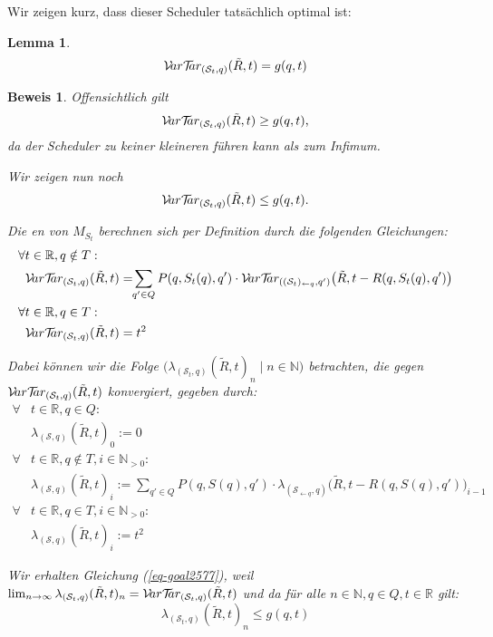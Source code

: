 \documentclass[a4paper]{article}
\newtheorem{lemma}[satz]{Lemma}
\theoremstyle{nonumberplain}
\newtheorem{beweis}{Beweis}
\begin{document}
	Wir zeigen kurz, dass dieser Scheduler tatsächlich optimal ist:
	\begin{lemma}
		\begin{equation}
		\mathcal{V}\!ar \mathcal{T}\!\!ar_{(\mathcal{S}_t,q)}(\tilde{R},t) = g(q,t)
		\end{equation}
	\end{lemma}
	\begin{beweis}
		Offensichtlich gilt 
		\[\mathcal{V}\!ar \mathcal{T}\!\!ar_{(\mathcal{S}_t,q)}(\tilde{R},t) \geq g(q,t)\text{,}\]
		da der Scheduler zu keiner kleineren \vt{} führen kann als zum Infimum.
		
		Wir zeigen nun noch
		\begin{equation}\label{eq-goal2577}
		\mathcal{V}\!ar \mathcal{T}\!\!ar_{(\mathcal{S}_t,q)}(\tilde{R},t) \leq g(q,t)\text{.}
		\end{equation}
		
		Die \vt{}en von $M_{S_t}$ berechnen sich per Definition durch die folgenden Gleichungen:
		\begin{align*}
		\forall & t \in \mathbb{R}, q \notin T : \\
		& \mvt_{(\mathcal{S}_t,q)}(\tilde{R},t) = \!\! \sum_{q' \in Q} P(q,S_t(q),q') \cdot \mvt_{((\mathcal{S}_t)_{\leftarrow q},q')}\big(\tilde{R},t - R(q,S_t(q),q')\big) \\
		\forall & t \in \mathbb{R}, q \in T : \\
		& \mvt_{(\mathcal{S}_t,q)}(\tilde{R},t) = t^2
		\end{align*}
		
		Dabei können wir die Folge $\big(\lambda_{(\mathcal{S}_t,q)}(\tilde{R},t)_n\mid n \in \mathbb{N}\big)$ betrachten, die gegen $\mathcal{V}\!ar \mathcal{T}\!\!ar_{(\mathcal{S}_t,q)}(\tilde{R},t)$ konvergiert, gegeben durch:
		\begin{align*}
		\forall & t \in \mathbb{R}, q \in Q: \\
		& \lambda_{(\mathcal{S},q)}(\tilde{R},t)_0 := 0 \\
		\forall & t \in \mathbb{R}, q \notin T, i \in \mathbb{N}_{>0}: \\
		& \lambda_{(\mathcal{S},q)}(\tilde{R},t)_i := \sum_{q' \in Q} P(q,S(q),q') \cdot \lambda_{(\mathcal{S}_{\leftarrow q},q)}\big(\tilde{R},t - R(q,S(q),q')\big)_{i-1} \\
		\forall & t \in \mathbb{R}, q \in T, i \in \mathbb{N}_{>0} : \\
		& \lambda_{(\mathcal{S},q)}(\tilde{R},t)_i := t^2
		\end{align*}
		
		Wir erhalten Gleichung (\ref{eq-goal2577}), weil $\lim_{n \to \infty}{\lambda_{(\mathcal{S}_t,q)}(\tilde{R},t)_n} = \mathcal{V}\!ar \mathcal{T}\!\!ar_{(\mathcal{S}_t,q)}(\tilde{R},t)$ und da für alle $n\in \mathbb{N}, q\in Q, t \in \mathbb{R}$ gilt:
		\[
		\lambda_{(\mathcal{S}_t,q)}(\tilde{R},t)_n \leq g(q,t)
		\]
		

\end{beweis}
\end{document}
